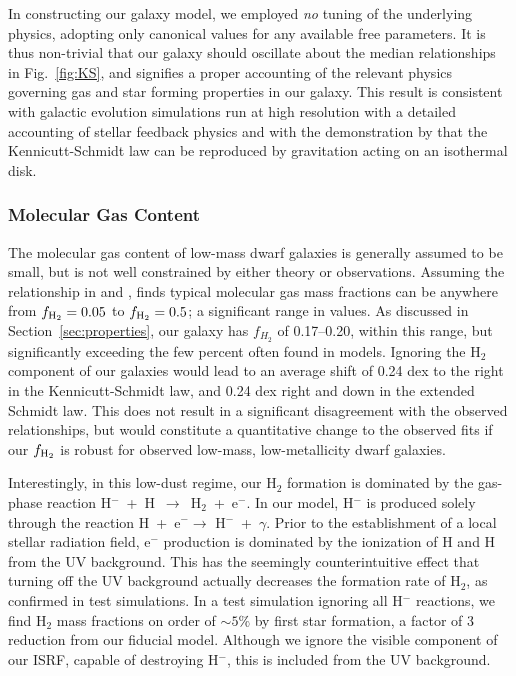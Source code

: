 \documentclass[twocolumn]{aastex61}
\begin{document}
In constructing our galaxy model, we employed \textit{no} tuning of the underlying physics, adopting only canonical values for any available free parameters. It is thus non-trivial that our galaxy should oscillate about the median relationships in Fig.~\ref{fig:KS}, and signifies a proper accounting of the relevant physics governing gas and star forming properties in our galaxy. This result is consistent with galactic evolution simulations run at high resolution with a detailed accounting of stellar feedback physics \citep[see ][ and references therein]{NaabOstriker2017} and with the demonstration by \citet{Li2005} that the Kennicutt-Schmidt law can be reproduced by gravitation acting on an isothermal disk. 

\subsubsection{Molecular Gas Content}
\label{sec:molecular gas content}

The molecular gas content of low-mass dwarf galaxies is generally assumed
to be small, but is not well constrained by either theory or observations. Assuming the relationship in \citet{Leroy2013} and \citet{Momose2013}, \citet{Roychowdhury2014} finds typical molecular gas mass fractions can be anywhere from $f_{\rm H_2} = 0.05$ to $f_{\rm H_2} = 0.5$; a significant range in values. As discussed in Section~\ref{sec:properties}, our galaxy has $f_{H_2}$ of 0.17--0.20, within this range, but significantly exceeding the few percent often found in models. Ignoring the H$_2$ component of our galaxies would lead to an average shift of 0.24 dex to the right in the Kennicutt-Schmidt law, and 0.24 dex right and down in the extended Schmidt law. This does not result in a significant disagreement with the observed relationships, but would constitute a quantitative change to the observed fits if our $f_{\rm H_2}$ is robust for observed low-mass, low-metallicity dwarf galaxies. 

Interestingly, in this low-dust regime, our H$_2$ formation is dominated by the gas-phase reaction H$^-$~+~H~$\rightarrow$~H$_2$~+~e$^{-}$. In our model, H$^{-}$ is produced solely through the reaction H~+~e$^{-} \rightarrow$ H$^{-}$~+~$\gamma$. Prior to the establishment of a local stellar radiation field, e$^{-}$ production is dominated by the ionization of H and H from the UV background. This has the seemingly counterintuitive effect that turning off the UV background actually decreases the formation rate of H$_2$, as confirmed in test simulations. In a test simulation ignoring all H$^{-}$ reactions, we find H$_{2}$ mass fractions on order of  $\sim 5\%$ by first star formation, a factor of 3 reduction from our fiducial model. Although we ignore the visible component of our ISRF, capable of destroying H$^{-}$, this is included from the UV background.
\end{document}
